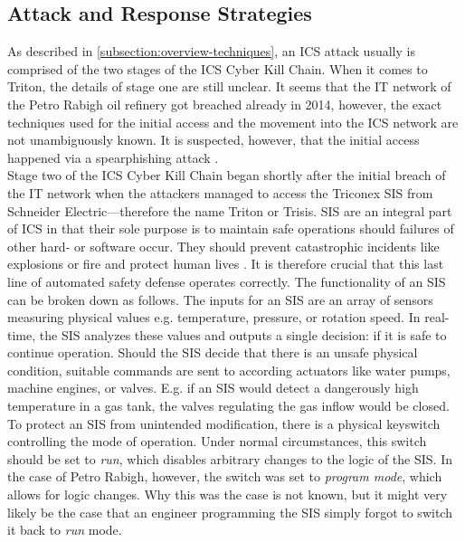 \documentclass[runningheads]{llncs}
\begin{document}
\subsection{Attack and Response Strategies}
\label{subsection:triton-attack-response}
As described in \autoref{subsection:overview-techniques}, an ICS attack usually is comprised of the two stages of the ICS Cyber Kill Chain.
When it comes to Triton, the details of stage one are still unclear.
It seems that the IT network of the Petro Rabigh oil refinery got breached already in 2014, however, the exact techniques used for the initial access and the movement into the ICS network are not unambiguously known.
It is suspected, however, that the initial access happened via a spearphishing attack \cite{nohe.19}.
\\
Stage two of the ICS Cyber Kill Chain began shortly after the initial breach of the IT network when the attackers managed to access the Triconex SIS from Schneider Electric---therefore the name Triton or Trisis.
SIS are an integral part of ICS in that their sole purpose is to maintain safe operations should failures of other hard- or software occur.
They should prevent catastrophic incidents like explosions or fire and protect human lives \cite{pinto.18}.
It is therefore crucial that this last line of automated safety defense operates correctly.
The functionality of an SIS can be broken down as follows.
The inputs for an SIS are an array of sensors measuring physical values e.g. temperature, pressure, or rotation speed.
In real-time, the SIS analyzes these values and outputs a single decision: if it is safe to continue operation.
Should the SIS decide that there is an unsafe physical condition, suitable commands are sent to according actuators like water pumps, machine engines, or valves.
E.g. if an SIS would detect a dangerously high temperature in a gas tank, the valves regulating the gas inflow would be closed. \cite{dragos.17} \\
To protect an SIS from unintended modification, there is a physical keyswitch controlling the mode of operation.
Under normal circumstances, this switch should be set to \textit{run}, which disables arbitrary changes to the logic of the SIS.
In the case of Petro Rabigh, however, the switch was set to \textit{program mode}, which allows for logic changes.
Why this was the case is not known, but it might very likely be the case that an engineer programming the SIS simply forgot to switch it back to \textit{run} mode.
\end{document}
